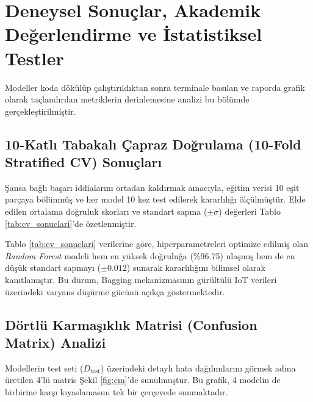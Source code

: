\documentclass[12pt,a4paper]{article}
\begin{document}
\section{Deneysel Sonuçlar, Akademik Değerlendirme ve İstatistiksel Testler}
Modeller koda dökülüp çalıştırıldıktan sonra terminale basılan ve raporda grafik olarak taçlandırılan metriklerin derinlemesine analizi bu bölümde gerçekleştirilmiştir.

\subsection{10-Katlı Tabakalı Çapraz Doğrulama (10-Fold Stratified CV) Sonuçları}
Şansa bağlı başarı iddialarını ortadan kaldırmak amacıyla, eğitim verisi 10 eşit parçaya bölünmüş ve her model 10 kez test edilerek kararlılığı ölçülmüştür. Elde edilen ortalama doğruluk skorları ve standart sapma ($\pm\sigma$) değerleri Tablo \ref{tab:cv_sonuclari}'de özetlenmiştir.

\begin{table}[H]
\centering
\caption{\bfseries Modellerin 10-Katlı Çapraz Doğrulama Performans Analizi}
\vspace{0.2cm}
\renewcommand{\arraystretch}{1.2}
\label{tab:cv_sonuclari}
\end{table}

Tablo \ref{tab:cv_sonuclari} verilerine göre, hiperparametreleri optimize edilmiş olan \textit{Random Forest} modeli hem en yüksek doğruluğa (\%96.75) ulaşmış hem de en düşük standart sapmayı ($\pm 0.012$) sunarak kararlılığını bilimsel olarak kanıtlamıştır. Bu durum, Bagging mekanizmasının gürültülü IoT verileri üzerindeki varyans düşürme gücünü açıkça göstermektedir.

\subsection{Dörtlü Karmaşıklık Matrisi (Confusion Matrix) Analizi}
Modellerin test seti ($D_{\text{test}}$) üzerindeki detaylı hata dağılımlarını görmek adına üretilen 4'lü matris Şekil \ref{fig:cm}'de sunulmuştur. Bu grafik, 4 modelin de birbirine karşı kıyaslamasını tek bir çerçevede sunmaktadır.
\end{document}
